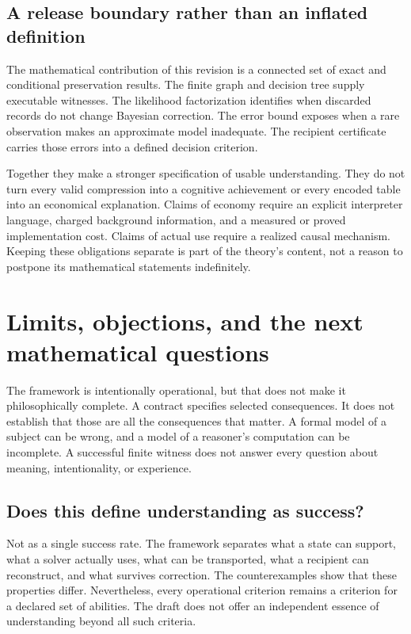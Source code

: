 \documentclass[11pt,letterpaper]{article}
\theoremstyle{plain}
\theoremstyle{definition}
\begin{document}
\subsection{A release boundary rather than an inflated definition}
The mathematical contribution of this revision is a connected set of exact and conditional preservation results. The finite graph and decision tree supply executable witnesses. The likelihood factorization identifies when discarded records do not change Bayesian correction. The error bound exposes when a rare observation makes an approximate model inadequate. The recipient certificate carries those errors into a defined decision criterion.

Together they make a stronger specification of usable understanding. They do not turn every valid compression into a cognitive achievement or every encoded table into an economical explanation. Claims of economy require an explicit interpreter language, charged background information, and a measured or proved implementation cost. Claims of actual use require a realized causal mechanism. Keeping these obligations separate is part of the theory's content, not a reason to postpone its mathematical statements indefinitely.


\section{Limits, objections, and the next mathematical questions}\label{sec:limits}
The framework is intentionally operational, but that does not make it philosophically complete. A contract specifies selected consequences. It does not establish that those are all the consequences that matter. A formal model of a subject can be wrong, and a model of a reasoner's computation can be incomplete. A successful finite witness does not answer every question about meaning, intentionality, or experience.

\subsection{Does this define understanding as success?}
Not as a single success rate. The framework separates what a state can support, what a solver actually uses, what can be transported, what a recipient can reconstruct, and what survives correction. The counterexamples show that these properties differ. Nevertheless, every operational criterion remains a criterion for a declared set of abilities. The draft does not offer an independent essence of understanding beyond all such criteria.
\end{document}
